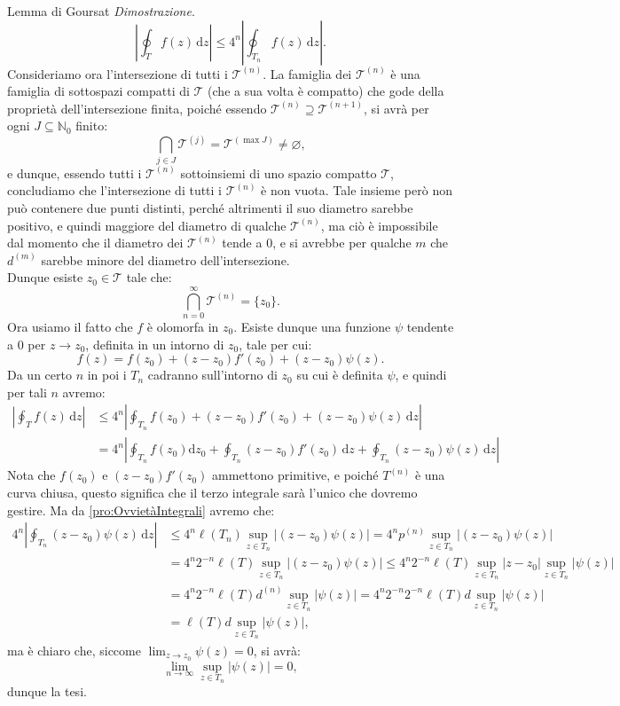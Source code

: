 \documentclass[11pt]{book}
\makeatletter
\theoremstyle{Definizione}
\theoremstyle{TeoremaProposizioneLemmaCorollarioCongettura}
\theoremstyle{OsservazioneNotaEsempio}
\renewenvironment{proof}[1][\proofname]{\par
  \normalfont \topsep6\p@\@plus6\p@\relax
  \trivlist
  \item[\hskip\labelsep
        \itshape
    #1\@addpunct{.}]\ignorespaces
}{%
  \endtrivlist\@endpefalse
}
\renewenvironment{proof}{\textsl{Dimostrazione}.}{}
\newcommand{\N}{\mathbb{N}}
\renewcommand{\d}{\mathrm{d}}
\newcommand{\dz}{\,\d z}
\makeatother
\begin{document}
\begin{boxteo}{Lemma di Goursat}
\begin{proof}
\begin{equation}\label{eq:teo:dim:LemmaDiGoursatEq1Iterata}
\left|\oint_T f(z)\dz\right| \leq 4^n \left|\oint_{T_n} f(z)\dz\right|.
\end{equation}
Consideriamo ora l'intersezione di tutti i $\mathscr{T}^{(n)}$. La famiglia dei $\mathscr{T}^{(n)}$ è una famiglia di sottospazi compatti di $\mathscr{T}$ (che a sua volta è compatto) che gode della proprietà dell'intersezione finita, poiché essendo $\mathscr{T}^{(n)}\supseteq \mathscr{T}^{(n+1)}$, si avrà per ogni $J\subseteq \N_0$ finito:
$$
\bigcap_{j\in J} \mathscr{T}^{(j)} = \mathscr{T}^{(\max J)}\neq \varnothing,
$$
e dunque, essendo tutti i $\mathscr{T}^{(n)}$ sottoinsiemi di uno spazio compatto $\mathscr{T}$, concludiamo che l'intersezione di tutti i $\mathscr{T}^{(n)}$ è non vuota. Tale insieme però non può contenere due punti distinti, perché altrimenti il suo diametro sarebbe positivo, e quindi maggiore del diametro di qualche $\mathscr{T}^{(n)}$, ma ciò è impossibile dal momento che il diametro dei $\mathscr{T}^{(n)}$ tende a $0$, e si avrebbe per qualche $m$ che $d^{(m)}$ sarebbe minore del diametro dell'intersezione.\\
Dunque esiste $z_0\in \mathscr{T}$ tale che:
$$
\bigcap_{n = 0}^\infty \mathscr{T}^{(n)} = \{z_0\}.
$$
Ora usiamo il fatto che $f$ è olomorfa in $z_0$. Esiste dunque una funzione $\psi$ tendente a $0$ per $z \to z_0$, definita in un intorno di $z_0$, tale per cui:
$$
f(z) = f(z_0) + (z-z_0) f'(z_0) + (z-z_0) \psi(z).
$$
Da un certo $n$ in poi i $T_n$ cadranno sull'intorno di $z_0$ su cui è definita $\psi$, e quindi per tali $n$ avremo:
\begin{align*}
\left|\oint_T f(z)\dz\right| &\leq 4^n \left|\oint_{T_n} f(z_0) + (z-z_0)f'(z_0)+(z-z_0)\psi(z)\dz\right|\\
 &= 4^n \left|\oint_{T_n} f(z_0) \mathrm{d}z_0 + \oint_{T_n} (z-z_0)f'(z_0) \dz+ \oint_{T_n} (z-z_0) \psi(z)\dz\right|
\end{align*}
Nota che $f(z_0)$ e $(z-z_0)f'(z_0)$ ammettono primitive, e poiché $T^{(n)}$ è una curva chiusa, questo significa che il terzo integrale sarà l'unico che dovremo gestire. Ma da \ref{pro:OvvietàIntegrali} avremo che:
\begin{align*}
4^n \left|\oint_{T_n} (z-z_0)\psi(z)\dz\right| &\leq 4^n \ell(T_n) \sup_{z\in T_n} |(z-z_0)\psi(z)| = 4^n p^{(n)} \sup_{z\in T_n} |(z-z_0)\psi(z)|\\
&= 4^n 2^{-n} \ell(T) \sup_{z\in T_n } |(z-z_0)\psi(z)| \leq 4^n 2^{-n} \ell(T) \sup_{z\in T_n} |z-z_0| \sup_{z\in T_n} |\psi(z)|\\
&= 4^{n}2^{-n} \ell(T) d^{(n)} \sup_{z\in T_n} |\psi(z)| = 4^{n}2^{-n}2^{-n} \ell(T)d\sup_{z\in T_n} |\psi(z)| \\
&= \ell(T)d\sup_{z\in T_n} |\psi(z)|,
\end{align*}
ma è chiaro che, siccome $\lim_{z \to z_0} \psi(z) = 0$, si avrà:
$$
\lim_{n \to \infty} \sup_{z\in T_n} |\psi(z)| = 0,
$$
dunque la tesi.
\end{proof}
\end{boxteo}
\end{document}
